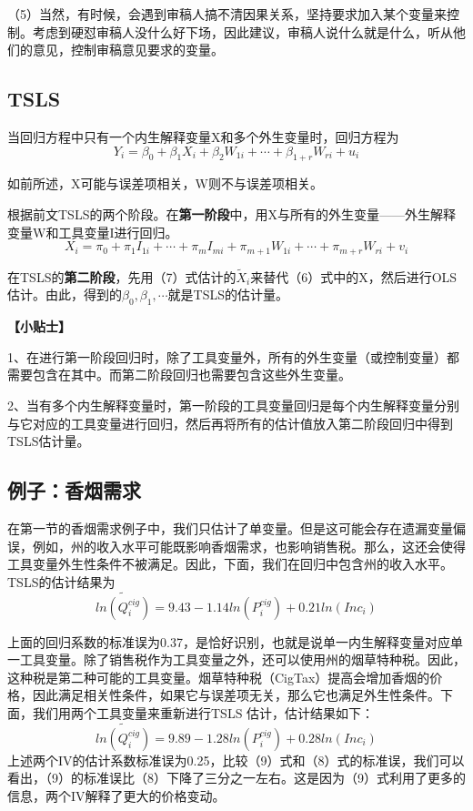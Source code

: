 \documentclass[cn,12pt,math=newtx,citestyle=gb7714-2015,bibstyle=gb7714-2015]{elegantbook}
\begin{document}
	（5）当然，有时候，会遇到审稿人搞不清因果关系，坚持要求加入某个变量来控制。考虑到硬怼审稿人没什么好下场，因此建议，审稿人说什么就是什么，听从他们的意见，控制审稿意见要求的变量。
	
	\subsection{TSLS}
	
	当回归方程中只有一个内生解释变量X和多个外生变量时，回归方程为
	\begin{equation}
		Y_i=\beta_0+\beta_1X_i+\beta_2W_{1i}+\cdots+\beta_{1+r}W_{ri}+u_i
	\end{equation}
	
	如前所述，X可能与误差项相关，W则不与误差项相关。
	
	根据前文TSLS的两个阶段。在\textbf{第一阶段}中，用X与所有的外生变量——外生解释变量W和工具变量I进行回归。
	\begin{equation}
		X_i=\pi_0+\pi_1I_{1i}+\cdots+\pi_mI_{mi}+\pi_{m+1}W_{1i}+\cdots+\pi_{m+r}W_{ri}+v_i
	\end{equation}
	
	在TSLS的\textbf{第二阶段}，先用（7）式估计的$\tilde{X}_i$来替代（6）式中的X，然后进行OLS估计。由此，得到的$\beta_0,\beta_1,\cdots$就是TSLS的估计量。
	
	\textbf{【小贴士】}
	
	1、在进行第一阶段回归时，除了工具变量外，所有的外生变量（或控制变量）都需要包含在其中。而第二阶段回归也需要包含这些外生变量。
	
	2、当有多个内生解释变量时，第一阶段的工具变量回归是每个内生解释变量分别与它对应的工具变量进行回归，然后再将所有的估计值放入第二阶段回归中得到TSLS估计量。
	
	\subsection{例子：香烟需求}
	
	在第一节的香烟需求例子中，我们只估计了单变量。但是这可能会存在遗漏变量偏误，例如，州的收入水平可能既影响香烟需求，也影响销售税。那么，这还会使得工具变量外生性条件不被满足。因此，下面，我们在回归中包含州的收入水平。TSLS的估计结果为
	\begin{equation}
		\tilde{ln(Q_i^{cig})}=9.43-1.14ln(P_i^{cig})+0.21ln(Inc_i)
	\end{equation}
	
	上面的回归系数的标准误为0.37，是恰好识别，也就是说单一内生解释变量对应单一工具变量。除了销售税作为工具变量之外，还可以使用州的烟草特种税。因此，这种税是第二种可能的工具变量。烟草特种税（CigTax）提高会增加香烟的价格，因此满足相关性条件，如果它与误差项无关，那么它也满足外生性条件。下面，我们用两个工具变量来重新进行TSLS 估计，估计结果如下：
	\begin{equation}
		\tilde{ln(Q_i^{cig})}=9.89-1.28ln(P_i^{cig})+0.28ln(Inc_i)
	\end{equation}
	上述两个IV的估计系数标准误为0.25，比较（9）式和（8）式的标准误，我们可以看出，（9）的标准误比（8）下降了三分之一左右。这是因为（9）式利用了更多的信息，两个IV解释了更大的价格变动。
	
\end{document}
